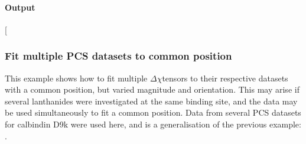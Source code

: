 \documentclass[a4paper,10pt,english,openany,oneside]{sphinxmanual}
\begin{document}
\begin{sphinxVerbatim}[commandchars=\\\{\}]
      

  

  

  
\end{sphinxVerbatim}


\paragraph{Output}
\label{\detokenize{examples/pcs_plot_isosurface:output}}
\sphinxAtStartPar
{}

\sphinxAtStartPar
{[}\sphinxcode{\sphinxupquote{pcs\_plot\_isosurface.png}}{]}

\noindent{}


\subsubsection{Fit multiple PCS datasets to common position}
\label{\detokenize{examples/pcs_fit_multiple:fit-multiple-pcs-datasets-to-common-position}}\label{\detokenize{examples/pcs_fit_multiple:pcs-fit-multiple}}\label{\detokenize{examples/pcs_fit_multiple::doc}}
\sphinxAtStartPar
This example shows how to fit multiple \({\Delta\chi}\)\sphinxhyphen{}tensors to their respective datasets with a common position, but varied magnitude and orientation. This may arise if several lanthanides were investigated at the same binding site, and the data may be used simultaneously to fit a common position. Data from several PCS datasets for calbindin D9k were used here, and is a generalisation of the previous example: {\hyperref[\detokenize{examples/pcs_fit:pcs-fit}]{}}.
\end{document}
